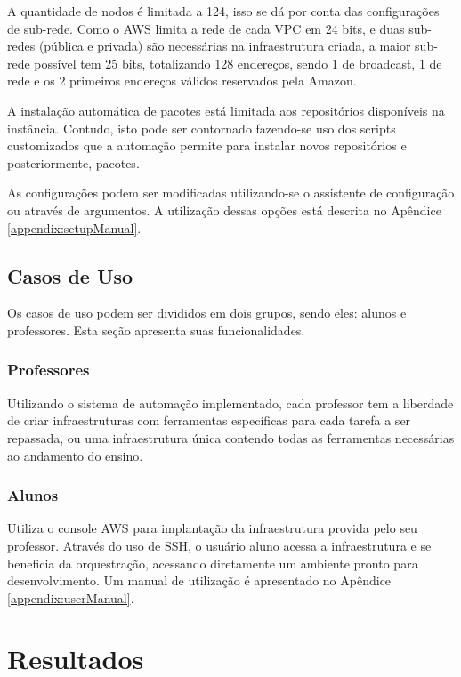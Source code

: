 \documentclass[tg]{mdtufsm}
\begin{document}
A quantidade de nodos é limitada a 124, isso se dá por conta das configurações de sub-rede. Como o AWS limita a rede de cada VPC em 24 bits, e duas sub-redes (pública e privada) são necessárias na infraestrutura criada, a maior sub-rede possível tem 25 bits, totalizando 128 endereços, sendo 1 de broadcast, 1 de rede e os 2 primeiros endereços válidos reservados pela Amazon.

A instalação automática de pacotes está limitada aos repositórios disponíveis na instância. Contudo, isto pode ser contornado fazendo-se uso dos scripts customizados que a automação permite para instalar novos repositórios e posteriormente, pacotes.

As configurações podem ser modificadas utilizando-se o assistente de configuração ou através de argumentos. A utilização dessas opções está descrita no Apêndice \ref{appendix:setupManual}.


\section{Casos de Uso}

Os casos de uso podem ser divididos em dois grupos, sendo eles: alunos e professores. Esta seção apresenta suas funcionalidades.

\subsection{Professores}

Utilizando o sistema de automação implementado, cada professor tem a liberdade de criar infraestruturas com ferramentas específicas para cada tarefa a ser repassada, ou uma infraestrutura única contendo todas as ferramentas necessárias ao andamento do ensino.

\subsection{Alunos}

Utiliza o console AWS para implantação da infraestrutura provida pelo seu professor. Através do uso de SSH, o usuário aluno acessa a infraestrutura e se beneficia da orquestração, acessando diretamente um ambiente pronto para desenvolvimento. Um manual de utilização é apresentado no Apêndice \ref{appendix:userManual}.


\chapter{Resultados}
\end{document}

